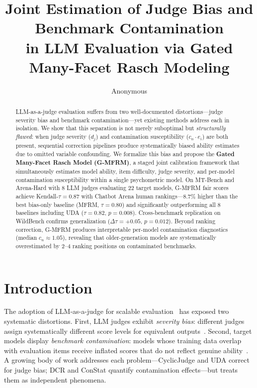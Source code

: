\documentclass[11pt]{article}
\title{Joint Estimation of Judge Bias and Benchmark Contamination\\in LLM Evaluation via Gated Many-Facet Rasch Modeling}
\author{Anonymous}
\date{}
\newcommand{\gmfrm}{\textsc{G-MFRM}}
\newcommand{\ei}{e_i}
\newcommand{\cn}{c_n}
\newcommand{\djud}{d_j}
\begin{document}
\maketitle

\begin{abstract}
LLM-as-a-judge evaluation suffers from two well-documented distortions---judge severity bias and benchmark contamination---yet existing methods address each in isolation. We show that this separation is not merely suboptimal but \emph{structurally flawed}: when judge severity ($\djud$) and contamination susceptibility ($\cn \cdot \ei$) are both present, sequential correction pipelines produce systematically biased ability estimates due to omitted variable confounding. We formalize this bias and propose the \textbf{Gated Many-Facet Rasch Model (\gmfrm{})}, a staged joint calibration framework that simultaneously estimates model ability, item difficulty, judge severity, and per-model contamination susceptibility within a single psychometric model. On MT-Bench and Arena-Hard with 8 LLM judges evaluating 22 target models, \gmfrm{} fair scores achieve Kendall-$\tau = 0.87$ with Chatbot Arena human rankings---8.7\% higher than the best bias-only baseline (MFRM, $\tau = 0.80$) and significantly outperforming all 8 baselines including UDA ($\tau = 0.82$, $p = 0.008$). Cross-benchmark replication on WildBench confirms generalization ($\Delta\tau = +0.05$, $p = 0.012$). Beyond ranking correction, \gmfrm{} produces interpretable per-model contamination diagnostics (median $\cn \approx 1.05$), revealing that older-generation models are systematically overestimated by 2--4 ranking positions on contaminated benchmarks.
\end{abstract}

\section{Introduction}

The adoption of LLM-as-a-judge for scalable evaluation~\citep{zheng2023judging} has exposed two systematic distortions. First, LLM judges exhibit \emph{severity bias}: different judges assign systematically different score levels for equivalent outputs~\citep{li2024cyclicjudge,wu2024uda}. Second, target models display \emph{benchmark contamination}: models whose training data overlap with evaluation items receive inflated scores that do not reflect genuine ability~\citep{golchin2023contamination,shi2023minKpct,dekoninck2024constat}. A growing body of work addresses each problem---CyclicJudge and UDA correct for judge bias; DCR and ConStat quantify contamination effects---but treats them as independent phenomena.
\end{document}
